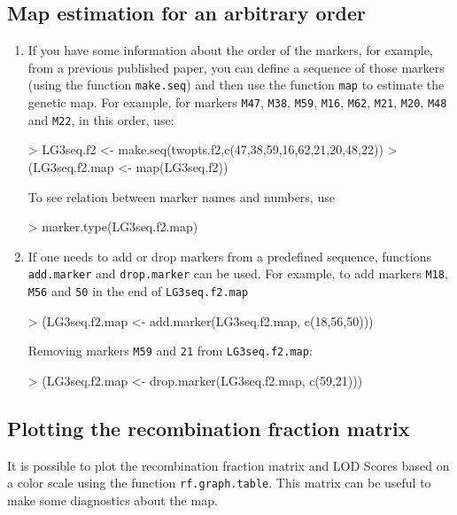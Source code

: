 \documentclass[letterpaper,12pt,oneside]{article}
\begin{document}
\subsection{Map estimation for an arbitrary order}
\label{arbitraryf2}
\begin{enumerate}
\item  If you have some information about the order of the markers, for example, from a previous published paper, you can define a sequence of those markers (using the function {\tt make.seq}) and then use the function {\tt map} to estimate the genetic map. For example, for markers {\tt M47}, {\tt M38}, {\tt M59},  {\tt M16}, {\tt M62},  {\tt M21}, {\tt M20},  {\tt M48} and  {\tt M22}, in this order, use:  
    
\begin{Schunk}
\begin{Sinput}
> LG3seq.f2 <- make.seq(twopts.f2,c(47,38,59,16,62,21,20,48,22))
> (LG3seq.f2.map <- map(LG3seq.f2))
\end{Sinput}
\end{Schunk}

To see relation between marker names and numbers, use

\begin{Schunk}
\begin{Sinput}
>  marker.type(LG3seq.f2.map)
\end{Sinput}
\end{Schunk}

\item If one needs to add or drop markers from a predefined sequence, functions {\tt add.marker} and {\tt drop.marker} can be used. For example, to add markers {\tt M18}, {\tt M56} and {\tt 50} in the end of {\tt LG3seq.f2.map}
\begin{Schunk}
\begin{Sinput}
> (LG3seq.f2.map <- add.marker(LG3seq.f2.map, c(18,56,50)))
\end{Sinput}
\end{Schunk}

Removing markers {\tt M59} and {\tt 21} from {\tt LG3seq.f2.map}: 
\begin{Schunk}
\begin{Sinput}
> (LG3seq.f2.map <- drop.marker(LG3seq.f2.map, c(59,21)))
\end{Sinput}
\end{Schunk}
\end{enumerate}

\subsection{Plotting the recombination fraction matrix}
\label{recmat2}
It is possible to plot the recombination fraction matrix and LOD Scores based on a color scale using the function {\tt rf.graph.table}. This matrix can be useful to make some diagnostics about the map. 
  
\end{document}
